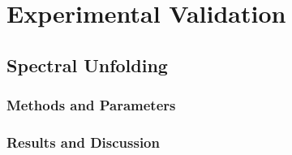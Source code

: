 
\cleardoublepage


\chapter{Experimental Validation}







\section{Spectral Unfolding}

\subsection{Methods and Parameters}

\subsection{Results and Discussion}

